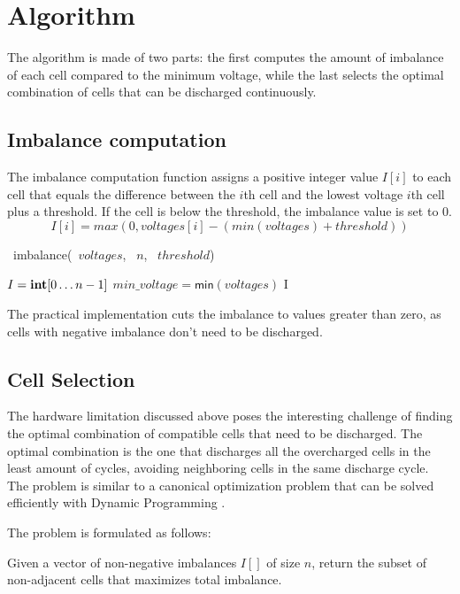 \section{Algorithm}

The algorithm is made of two parts: the first computes the amount of imbalance of each cell compared to the minimum voltage, while the last selects the optimal combination of cells that can be discharged continuously.

\subsection{Imbalance computation}

The imbalance computation function assigns a positive integer value $I[i]$ to each cell that equals the difference between the $i$th cell and the lowest voltage $i$th cell plus a threshold. If the cell is below the threshold, the imbalance value is set to 0.
\[
    I[i] = max(0, voltages[i] - (min(voltages) + threshold))
\]

\begin{algorithm}[H]
    \DontPrintSemicolon
    \NoCaptionOfAlgo
    \caption[imbalance]{\INTARRAY\ \textsf{imbalance}(\INTARRAY\ $voltages$, \INTEGER\ $n$, \INTEGER\ $threshold$)}\label{algorithm:imbalance}

    $I = \INTEGER[0 \ldots n-1]$\;
    $min\_voltage=\textsf{min}(voltages)$\;
    \Return I\;
\end{algorithm}
The practical implementation cuts the imbalance to values greater than zero, as cells with negative imbalance don't need to be discharged.

\subsection{Cell Selection}
The hardware limitation discussed above poses the interesting challenge of finding the optimal combination of compatible cells that need to be discharged. The optimal combination is the one that discharges all the overcharged cells in the least amount of cycles, avoiding neighboring cells in the same discharge cycle. The problem is similar to a canonical optimization problem that can be solved efficiently with Dynamic Programming \cite{montresor}.

The problem is formulated as follows:

Given a vector of non-negative imbalances $I[]$ of size $n$, return the subset of non-adjacent cells that maximizes total imbalance.


